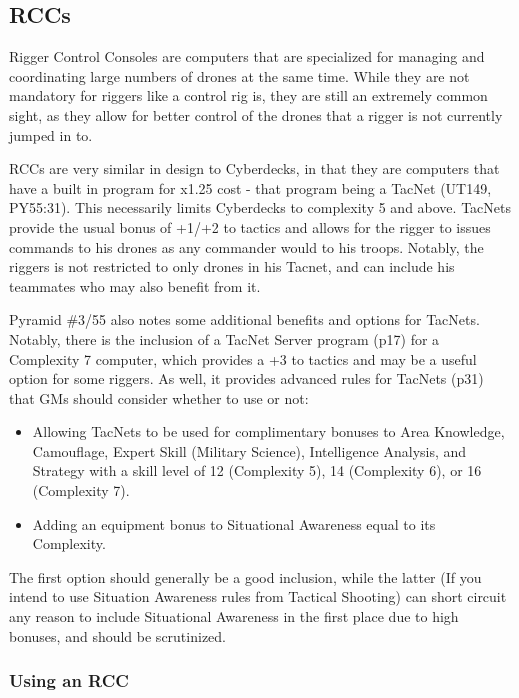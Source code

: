 \begin{multicols*}{3}
	\subsection{RCCs}
	
	Rigger Control Consoles are computers that are specialized for managing and coordinating large numbers of drones at the same time. While they are not mandatory for riggers like a control rig is, they are still an extremely common sight, as they allow for better control of the drones that a rigger is not currently jumped in to.
	
	RCCs are very similar in design to Cyberdecks, in that they are computers that have a built in program for x1.25 cost - that program being a TacNet (UT149, PY55:31). This necessarily limits Cyberdecks to complexity 5 and above. TacNets provide the usual bonus of +1/+2 to tactics and allows for the rigger to issues commands to his drones as any commander would to his troops. Notably, the riggers is not restricted to only drones in his Tacnet, and can include his teammates who may also benefit from it.
	
	Pyramid \#3/55 also notes some additional benefits and options for TacNets. Notably, there is the inclusion of a TacNet Server program (p17) for a Complexity 7 computer, which provides a +3 to tactics and may be a useful option for some riggers. As well, it provides advanced rules for TacNets (p31) that GMs should consider whether to use or not:
	
	\begin{itemize}
		\itemsep 0pt
		\item Allowing TacNets to be used for complimentary bonuses to Area Knowledge, Camouflage, Expert Skill (Military Science), Intelligence Analysis, and Strategy with a skill level of 12 (Complexity 5), 14 (Complexity 6), or 16 (Complexity 7).
		\item Adding an equipment bonus to Situational Awareness equal to its Complexity.
	\end{itemize}
	
	The first option should generally be a good inclusion, while the latter (If you intend to use Situation Awareness rules from Tactical Shooting) can short circuit any reason to include Situational Awareness in the first place due to high bonuses, and should be scrutinized.
	
	\subsubsection{Using an RCC}
	

\end{multicols*}
